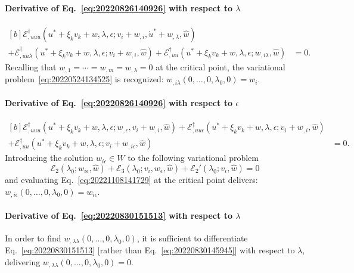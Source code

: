 \documentclass[12pt, final]{scrartcl}
\theoremstyle{definition}
\newcommand{\E}{\mathcal E}
\newcommand{\EE}{\mathcal E ^ \dagger}
\begin{document}
\paragraph{Derivative of Eq.~\eqref{eq:20220826140926} with respect to \(\lambda\)}
\begin{equation}
  \begin{aligned}[b]
    \EE_{,uuu}(u^\ast + \xi_k v_k + w, \lambda, \epsilon; v_i + w_{,i}, \dot{u}^\ast + w_{,\lambda}, \hat{w}) &\\
    + \EE_{,uu\lambda}(u^\ast + \xi_k v_k + w, \lambda, \epsilon; v_i + w_{,i}, \hat{w}) + \EE_{,uu}(u^\ast + \xi_k v_k + w, \lambda, \epsilon; w_{,i\lambda}, \hat{w}) &= 0.
  \end{aligned}
\end{equation}
Recalling that $w_{,1} = \cdots = w_{,m} = w_{,\lambda} = 0$ at the critical point, the variational
problem~\eqref{eq:20220524134525} is recognized: \(w_{,i\lambda}(0, \ldots, 0, \lambda_0, 0)=w_i\).

\paragraph{Derivative of Eq.~\eqref{eq:20220826140926} with respect to \(\epsilon\)}
\begin{equation}
  \label{eq:20221108141729}
  \begin{aligned}[b]
    \EE_{,uuu}(u^\ast + \xi_k v_k + w, \lambda, \epsilon; w_{,\epsilon}, v_i + w_{,i}, \hat{w}) + \EE_{,uu\epsilon}(u^\ast + \xi_k v_k + w, \lambda, \epsilon; v_i + w_{,i}, \hat{w}) &\\
    + \EE_{,uu}(u^\ast + \xi_k v_k + w, \lambda, \epsilon; v_i + w_{,i\epsilon}, \hat{w}) &= 0.
  \end{aligned}
\end{equation}
Introducing the solution \(w_{i\epsilon} \in W\) to the following variational problem
\begin{equation}
  \label{eq:20221030180004}
  \E_2(\lambda_0; w_{i\epsilon}, \hat{w}) + \E_3(\lambda_0; v_i, w_\epsilon, \hat{w}) + \E_2'(\lambda_0; v_i, \hat{w}) = 0
\end{equation}
and evaluating Eq.~\eqref{eq:20221108141729} at the critical point delivers: \(w_{,i\epsilon}(0, \ldots, 0, \lambda_0, 0)=w_{i\epsilon}\).

\paragraph{Derivative of Eq.~\eqref{eq:20220830151513} with respect to \(\lambda\)}
In order to find \(w_{,\lambda\lambda}(0, \ldots, 0, \lambda_0, 0)\), it is sufficient to differentiate Eq.~\eqref{eq:20220830151513} [rather
than Eq.~\eqref{eq:20220830145945}] with respect to \(\lambda\), delivering \(w_{,\lambda\lambda}(0, \ldots, 0, \lambda_0, 0)=0\).
\end{document}
